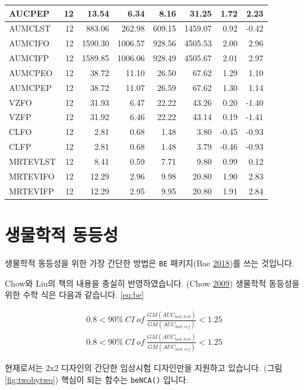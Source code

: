 \documentclass[
  12pt,
]{krantz}
\begin{document}
\begin{tabular}{l|r|r|r|r|r|r|r}
\hline
AUCPEP & 12 & 13.54 & 6.34 & 8.16 & 31.25 & 1.72 & 2.23\\
\hline
AUMCLST & 12 & 883.06 & 262.98 & 609.15 & 1459.07 & 0.92 & -0.42\\
\hline
AUMCIFO & 12 & 1590.30 & 1006.57 & 928.56 & 4505.53 & 2.00 & 2.96\\
\hline
AUMCIFP & 12 & 1589.85 & 1006.06 & 928.49 & 4505.67 & 2.01 & 2.97\\
\hline
AUMCPEO & 12 & 38.72 & 11.10 & 26.50 & 67.62 & 1.29 & 1.10\\
\hline
AUMCPEP & 12 & 38.72 & 11.07 & 26.59 & 67.62 & 1.30 & 1.14\\
\hline
VZFO & 12 & 31.93 & 6.47 & 22.22 & 43.26 & 0.20 & -1.40\\
\hline
VZFP & 12 & 31.92 & 6.46 & 22.22 & 43.14 & 0.19 & -1.41\\
\hline
CLFO & 12 & 2.81 & 0.68 & 1.48 & 3.80 & -0.45 & -0.93\\
\hline
CLFP & 12 & 2.81 & 0.68 & 1.48 & 3.79 & -0.46 & -0.93\\
\hline
MRTEVLST & 12 & 8.41 & 0.59 & 7.71 & 9.80 & 0.99 & 0.12\\
\hline
MRTEVIFO & 12 & 12.29 & 2.96 & 9.98 & 20.80 & 1.90 & 2.83\\
\hline
MRTEVIFP & 12 & 12.29 & 2.95 & 9.95 & 20.80 & 1.91 & 2.84\\
\hline
\end{tabular}

\hypertarget{bioequivalence}{%
\section{생물학적 동등성}\label{bioequivalence}}

생물학적 동등성을 위한 가장 간단한 방법은 \texttt{BE} 패키지(Bae \protect\hyperlink{ref-R-BE}{2018})를 쓰는 것입니다.

Chow와 Liu의 책의 내용을 충실히 반영하였습니다. (Chow \protect\hyperlink{ref-chow2009design}{2009})
생물학적 동등성을 위한 수학 식은 다음과 같습니다. \eqref{eq:be}

\[
\begin{align}
  0.8 < 90\%\ CI\ of\ \frac{GM(AUC_{last, test})}{GM(AUC_{last, ref})} < 1.25 \\
  0.8 < 90\%\ CI\ of\ \frac{GM(AUC_{last, test})}{GM(AUC_{last, ref})} < 1.25 \label{eq:be}
\end{align}
\]

현재로서는 2x2 디자인의 간단한 임상시험 디자인만을 지원하고 있습니다. (그림 \ref{fig:twobytwo})
핵심이 되는 함수는 \texttt{beNCA()} 입니다.
\end{document}
